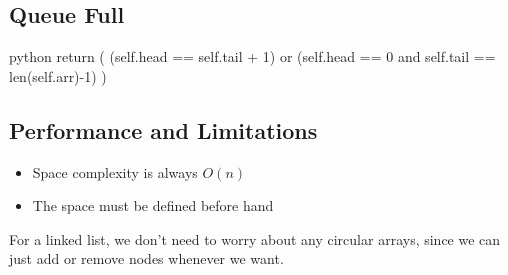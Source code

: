 \subsection{Queue Full}\label{sub:queue_full}

\begin{code}{python}
    return (
        (self.head == self.tail + 1) 
        or (self.head == 0 and self.tail == len(self.arr)-1)
    )
\end{code}

\subsection{Performance and Limitations}\label{sub:performance_and_limitations}

\begin{itemize}
    \item Space complexity is always \(O(n)\)
    \item The space must be defined before hand
\end{itemize}
\begin{note}
    For a linked list, we don't need to worry about any circular arrays, since we can just add or remove nodes whenever we want.
\end{note}
